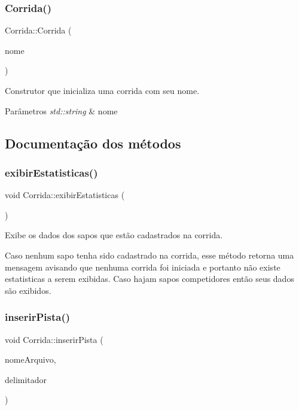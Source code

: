 \subsubsection{\texorpdfstring{Corrida()}{Corrida()}}
{\footnotesize\ttfamily Corrida\+::\+Corrida (\begin{DoxyParamCaption}\item[{std\+::string}]{nome }\end{DoxyParamCaption})}



Construtor que inicializa uma corrida com seu nome. 


\begin{DoxyParams}{Parâmetros}
{\em std\+::string} & nome \\
\hline
\end{DoxyParams}


\subsection{Documentação dos métodos}
\mbox{\label{classCorrida_a8bd6f41f4e0c7929c302feb13a01e0d5}} 
\subsubsection{\texorpdfstring{exibir\+Estatisticas()}{exibirEstatisticas()}}
{\footnotesize\ttfamily void Corrida\+::exibir\+Estatisticas (\begin{DoxyParamCaption}{ }\end{DoxyParamCaption})}



Exibe os dados dos sapos que estão cadastrados na corrida. 

Caso nenhum sapo tenha sido cadastrado na corrida, esse método retorna uma mensagem avisando que nenhuma corrida foi iniciada e portanto não existe estatisticas a serem exibidas. Caso hajam sapos competidores então seus dados são exibidos. \mbox{\label{classCorrida_a3a135667906e66adbe1a38ecdae0c048}} 
\subsubsection{\texorpdfstring{inserir\+Pista()}{inserirPista()}}
{\footnotesize\ttfamily void Corrida\+::inserir\+Pista (\begin{DoxyParamCaption}\item[{std\+::string}]{nome\+Arquivo,  }\item[{std\+::string}]{delimitador }\end{DoxyParamCaption})}




